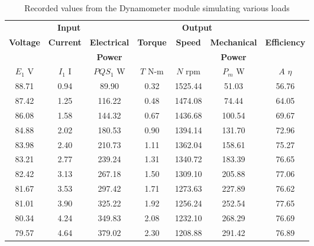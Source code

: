\documentclass{article}
\begin{document}
\begin{table}[H]
  \centering
  \begin{tabular}{*{7}{c}}
    \multicolumn{3}{c}{\textbf{Input}} & \multicolumn{3}{c}{\textbf{Output}}
    & \\

    \textbf{Voltage} & \textbf{Current} & \textbf{Electrical} &
    \textbf{Torque}  & \textbf{Speed}   & \textbf{Mechanical} &
    \textbf{Efficiency} \\

    &                  & \textbf{Power}      &
    &                  & \textbf{Power}
    & \\

    $E_1$ V          & $I_1$ I          & $PQS_1$ W           &
    $T$ N-m          & $N$ rpm          & $P_{m}$ W           &
    $A$ $\eta$ \\

    \hline

    88.71 & 0.94 &  89.90 & 0.32 & 1525.44 &  51.03 & 56.76 \\
    87.42 & 1.25 & 116.22 & 0.48 & 1474.08 &  74.44 & 64.05 \\
    86.08 & 1.58 & 144.32 & 0.67 & 1436.68 & 100.54 & 69.67 \\
    84.88 & 2.02 & 180.53 & 0.90 & 1394.14 & 131.70 & 72.96 \\
    83.98 & 2.40 & 210.73 & 1.11 & 1362.04 & 158.61 & 75.27 \\
    83.21 & 2.77 & 239.24 & 1.31 & 1340.72 & 183.39 & 76.65 \\
    82.42 & 3.13 & 267.18 & 1.50 & 1309.10 & 205.88 & 77.06 \\
    81.67 & 3.53 & 297.42 & 1.71 & 1273.63 & 227.89 & 76.62 \\
    81.01 & 3.90 & 325.22 & 1.92 & 1256.24 & 252.54 & 77.65 \\
    80.34 & 4.24 & 349.83 & 2.08 & 1232.10 & 268.29 & 76.69 \\
    79.57 & 4.64 & 379.02 & 2.30 & 1208.88 & 291.42 & 76.89 \\
  \end{tabular}
  \caption{Recorded values from the Dynamometer module simulating various loads}
  \label{tab:table_06}
\end{table}
\end{document}
